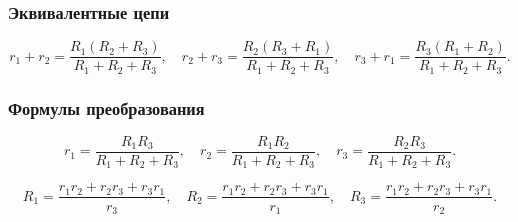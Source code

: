 \documentclass[12pt, a4paper]{article}
\begin{document}
\subsubsection*{Эквивалентные цепи}

\[
r_1 + r_2 = \frac{R_1(R_2 + R_3)}{R_1 + R_2 + R_3}, \quad
r_2 + r_3 = \frac{R_2(R_3 + R_1)}{R_1 + R_2 + R_3}, \quad
r_3 + r_1 = \frac{R_3(R_1 + R_2)}{R_1 + R_2 + R_3}.
\]

\subsubsection*{Формулы преобразования}

\[
r_1 = \frac{R_1 R_3}{R_1 + R_2 + R_3}, \quad
r_2 = \frac{R_1 R_2}{R_1 + R_2 + R_3}, \quad
r_3 = \frac{R_2 R_3}{R_1 + R_2 + R_3}.
\]

\[
R_1 = \frac{r_1 r_2 + r_2 r_3 + r_3 r_1}{r_3}, \quad
R_2 = \frac{r_1 r_2 + r_2 r_3 + r_3 r_1}{r_1}, \quad
R_3 = \frac{r_1 r_2 + r_2 r_3 + r_3 r_1}{r_2}.
\]
\end{document}
